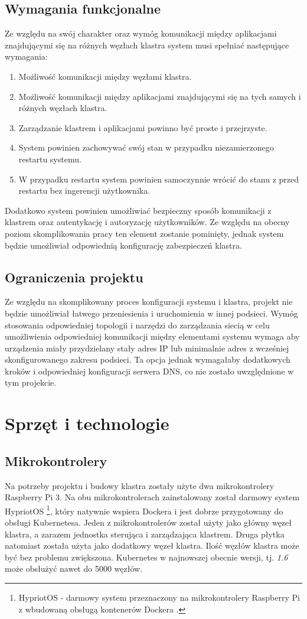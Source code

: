 \documentclass[12pt]{report}
\let\Oldsection\section
\renewcommand{\section}{\FloatBarrier\Oldsection}
\let\Oldsubsection\subsection
\renewcommand{\subsection}{\FloatBarrier\Oldsubsection}
\begin{document}
{\subsection{Wymagania funkcjonalne}
Ze względu na swój charakter oraz wymóg komunikacji między aplikacjami znajdującymi się na różnych węzłach klastra system musi spełniać następujące wymagania:

\begin{enumerate}
\item{Możliwość komunikacji między węzłami klastra.}
\item{Możliwość komunikacji między aplikacjami znajdującymi się na tych samych i różnych węzłach klastra.}
\item{Zarządzanie klastrem i aplikacjami powinno być proste i przejrzyste.}
\item{System powinien zachowywać swój stan w przypadku niezamierzonego restartu systemu.}
\item{W przypadku restartu system powinien samoczynnie wrócić do stanu z przed restartu bez ingerencji użytkownika.}
\end{enumerate}

Dodatkowo system powinien umożliwiać bezpieczny sposób komunikacji z klastrem oraz autentykację i autoryzację użytkowników. Ze względu na obecny poziom skomplikowania pracy ten element zostanie pominięty, jednak system będzie umożliwiał odpowiednią konfigurację zabezpieczeń klastra.
\subsection{Ograniczenia projektu}
Ze względu na skomplikowany proces konfiguracji systemu i klastra, projekt nie będzie umożliwiał łatwego przeniesienia i uruchomienia w innej podsieci. Wymóg stosowania odpowiedniej topologii i narzędzi do zarządzania siecią w celu umożliwienia odpowiedniej komunikacji między elementami systemu wymaga aby urządzenia miały przydzielany stały adres IP lub minimalnie adres z wcześniej skonfigurowanego zakresu podsieci. Ta opcja jednak wymagałaby dodatkowych kroków i odpowiedniej konfiguracji serwera DNS, co nie zostało uwzględnione w tym projekcie.

\section{Sprzęt i technologie}
\subsection{Mikrokontrolery}
Na potrzeby projektu i budowy klastra zostały użyte dwa mikrokontrolery Raspberry Pi 3. Na obu mikrokontrolerach zainstalowany został darmowy system HypriotOS \footnote{HypriotOS - darmowy system przeznaczony na mikrokontrolery Raspberry Pi z wbudowaną obsługą kontenerów Dockera \cite{hypriotos}.}, który natywnie wspiera Dockera i jest dobrze przygotowany do obsługi Kubernetesa. Jeden z mikrokontrolerów został użyty jako główny węzeł klastra, a zarazem jednostka sterująca i zarządzająca klastrem. Druga płytka natomiast została użyta jako dodatkowy węzeł klastra. Ilość węzłów klastra może być bez problemu zwiększona. Kubernetes w najnowszej obecnie wersji, tj. \textit{1.6} może obsłużyć nawet do 5000 węzłów. 
}
\end{document}
